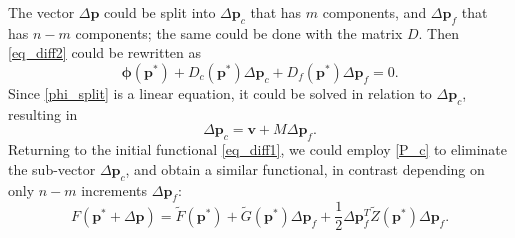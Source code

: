 The vector $\Delta\boldsymbol{p}$ could be split into $\Delta\boldsymbol{p}_c$ that has $m$ components, and $\Delta\boldsymbol{p}_f$ that has $n-m$ components; the same could be done with the matrix $D$. Then \eqref{eq_diff2} could be rewritten as
\begin{equation}\label{phi_split}
\boldsymbol{\phi}(\boldsymbol{p}^*) + D_c(\boldsymbol{p}^*) \Delta\boldsymbol{p}_c + D_f(\boldsymbol{p}^*) \Delta\boldsymbol{p}_f = 0.
\end{equation}
Since \eqref{phi_split} is a linear equation, it could be solved in relation to $\Delta\boldsymbol{p}_c$, resulting in
\begin{equation}\label{P_c}
\Delta\boldsymbol{p}_c = \boldsymbol{v} + M \Delta\boldsymbol{p}_f.
\end{equation}
Returning to the initial functional \eqref{eq_diff1}, we could employ \eqref{P_c} to eliminate the sub-vector $\Delta\boldsymbol{p}_c$, and obtain a similar functional, in contrast depending on only $n-m$ increments $\Delta\boldsymbol{p}_f$:
\begin{equation}\label{func_fin}
F(\boldsymbol{p}^*+\Delta\boldsymbol{p}) = \tilde F(\boldsymbol{p}^*) + \tilde G(\boldsymbol{p}^*) \Delta\boldsymbol{p}_f + \frac{1}{2}\Delta\boldsymbol{p}_f^T \tilde Z(\boldsymbol{p}^*) \Delta\boldsymbol{p}_f.
\end{equation}
